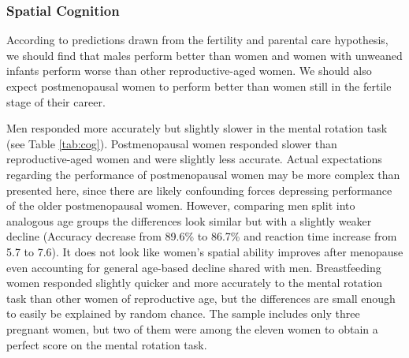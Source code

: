 		\subsubsection{Spatial Cognition}		
		\label{sec:3.1.1}
		
According to predictions drawn from the fertility and parental care hypothesis, we should find that males perform better than women and women with unweaned infants perform worse than other reproductive-aged women.  We should also expect postmenopausal women to perform better than women still in the fertile stage of their career.

Men responded more accurately but slightly slower in the mental rotation task (see Table \ref{tab:cog}).  Postmenopausal women responded slower than reproductive-aged women and were slightly less accurate.  Actual expectations regarding the performance of postmenopausal women may be more complex than presented here, since there are likely confounding forces depressing performance of the older postmenopausal women.  However, comparing men split into analogous age groups the differences look similar but with a slightly weaker decline (Accuracy decrease from 89.6\% to 86.7\% and reaction time increase from 5.7 to 7.6).  It does not look like women's spatial ability improves after menopause even accounting for general age-based decline shared with men.  Breastfeeding women responded slightly quicker and more accurately to the mental rotation task than other women of reproductive age, but the differences are small enough to easily be explained by random chance.  The sample includes only three pregnant women, but two of them were among the eleven women to obtain a perfect score on the mental rotation task.

